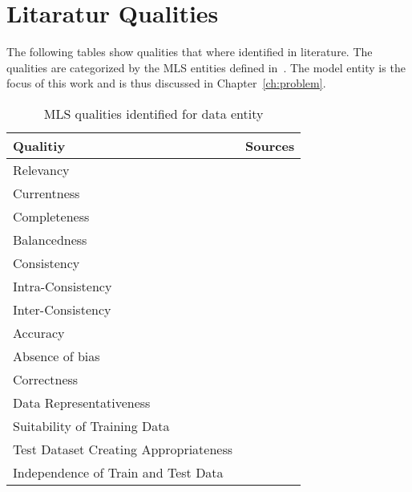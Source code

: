 \clearpage
%



\appendix
\chapter{Litaratur Qualities}

The following tables show qualities that where identified in literature.
The qualities are categorized by the \ac{MLS} entities defined in~\cite{siebert_construction_2021}.
The model entity is the focus of this work and is thus discussed in Chapter~\ref{ch:problem}.
\begin{table}[h]\label{tb:LiteratureQualitiesData}
    \centering\footnotesize
    \begin{tabular}{p{} p{}}
        \textbf{Qualitiy} & \textbf{Sources} \\
        \toprule
        Relevancy &~\cite{ashmore_assuring_2021} \\
        Currentness &~\cite{siebert_construction_2021} \\
        Completeness &~\cite{ashmore_assuring_2021, vogelsang_requirements_2019,
                            siebert_construction_2021} \\
        Balancedness &~\cite{ashmore_assuring_2021,siebert_construction_2021} \\
        Consistency &~\cite{vogelsang_requirements_2019} \\
        Intra-Consistency &~\cite{siebert_construction_2021} \\
        Inter-Consistency &~\cite{siebert_construction_2021} \\
        Accuracy &~\cite{ashmore_assuring_2021} \\
        Absence of bias &~\cite{siebert_construction_2021} \\
        Correctness &~\cite{vogelsang_requirements_2019} \\
        Data Representativeness&~\cite{nakamichi_requirements-driven_2020,
                                    siebert_construction_2021}\\
        Suitability of Training Data &~\cite{nakamichi_requirements-driven_2020} \\
        Test Dataset Creating Appropriateness &~\cite{nakamichi_requirements-driven_2020} \\
        Independence of Train and Test Data &~\cite{nakamichi_requirements-driven_2020,
                                                    siebert_construction_2021} \\
    \end{tabular}
    \caption{MLS qualities identified for data entity}
\end{table}

